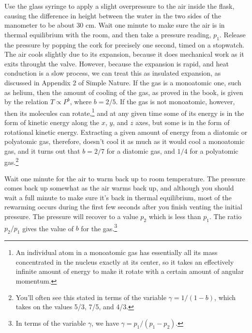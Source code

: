 Use the glass syringe to apply a slight overpressure to the air inside the
flask, causing the difference in height between the water in the
two sides of the manometer to be about 30 cm. Wait one minute to
make sure the air is in thermal equilibrium with the room, and
then take a pressure reading, $p_1$. Release the pressure by popping
the cork for precisely one second, timed on a stopwatch. The air cools
slightly due to its expansion, because it does mechanical work as it
exits throught the valve. However, because the expansion is rapid, and heat
conduction is a slow process, we can treat this as insulated expansion, as discussed
in Appendix 2 of Simple Nature. If the gas is a monoatomic one, such as helium,
then the amount of cooling of the gas, as proved in the book, is given by the
relation $T\propto P^b$, where $b=2/5$. If the gas is not monoatomic, however,
then its molecules can rotate,\footnote{An individual atom in a monoatomic gas has essentially all its
mass concentrated in the nucleus exactly at its center, so it takes an effectively infinite
amount of energy to make it rotate with a certain amount of angular momentum.} and at any given time some of its energy is in the
form of kinetic energy along the $x$, $y$, and $z$ axes, but some is in the form
of rotational kinetic energy. Extracting a given amount of energy from a diatomic
or polyatomic gas, therefore, doesn't cool it as much as it would cool a monoatomic
gas, and it turns out that $b=2/7$ for a diatomic gas, and $1/4$ for a polyatomic gas.\footnote{You'll
often see this stated in terms of the variable $\gamma=1/(1-b)$, which takes on the values
5/3, 7/5, and 4/3.}

Wait one minute for the air to warm back up
to room temperature. The pressure comes back up somewhat as the air warms back
up, and although you should wait a full minute to make sure it's back
in thermal equilibrium, most of the rewarming occurs during the first
few seconds after you finish venting the initial pressure. The pressure
will recover to a value $p_2$ which is less than $p_1$. The ratio
$p_2/p_1$ gives the value of $b$ for the gas.\footnote{In terms of the variable
$\gamma$, we have $\gamma=p_1/(p_1-p_2)$.}

